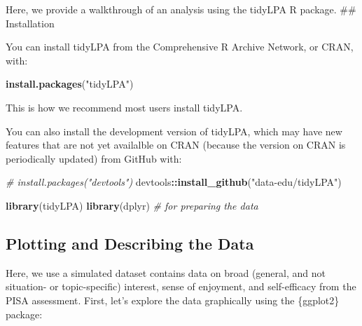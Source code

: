 \documentclass[man]{apa6}
\newenvironment{Shaded}{\begin{snugshade}}{\end{snugshade}}
\newcommand{\CommentTok}[1]{\textcolor[rgb]{0.56,0.35,0.01}{\textit{#1}}}
\newcommand{\DataTypeTok}[1]{\textcolor[rgb]{0.13,0.29,0.53}{#1}}
\newcommand{\KeywordTok}[1]{\textcolor[rgb]{0.13,0.29,0.53}{\textbf{#1}}}
\newcommand{\NormalTok}[1]{#1}
\newcommand{\OperatorTok}[1]{\textcolor[rgb]{0.81,0.36,0.00}{\textbf{#1}}}
\newcommand{\StringTok}[1]{\textcolor[rgb]{0.31,0.60,0.02}{#1}}
\begin{document}
Here, we provide a walkthrough of an analysis using the tidyLPA R package.
\#\# Installation

You can install tidyLPA from the Comprehensive R Archive Network, or CRAN, with:

\begin{Shaded}
\begin{Highlighting}[]
\KeywordTok{install.packages}\NormalTok{(}\StringTok{"tidyLPA"}\NormalTok{)}
\end{Highlighting}
\end{Shaded}

This is how we recommend most users install tidyLPA.

You can also install the development version of tidyLPA, which may have new
features that are not yet availalble on CRAN (because the version on CRAN is
periodically updated) from GitHub with:

\begin{Shaded}
\begin{Highlighting}[]
\CommentTok{# install.packages("devtools")}
\NormalTok{devtools}\OperatorTok{::}\KeywordTok{install_github}\NormalTok{(}\StringTok{"data-edu/tidyLPA"}\NormalTok{)}
\end{Highlighting}
\end{Shaded}

\begin{Shaded}
\begin{Highlighting}[]
\KeywordTok{library}\NormalTok{(tidyLPA)}
\KeywordTok{library}\NormalTok{(dplyr) }\CommentTok{# for preparing the data}
\end{Highlighting}
\end{Shaded}

\hypertarget{plotting-and-describing-the-data}{%
\subsection{Plotting and Describing the Data}\label{plotting-and-describing-the-data}}

Here, we use a simulated dataset contains data on broad (general, and not situation- or topic-specific) interest, sense of enjoyment, and self-efficacy from the PISA assessment.
First, let's explore the data graphically using the \{ggplot2\} package:

\begin{Shaded}
\end{Shaded}
\end{document}

